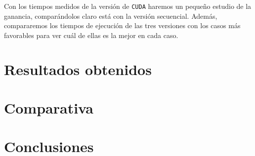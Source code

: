 \documentclass[11pt,a4paper]{article}
\begin{document}
Con los tiempos medidos de la versión de \texttt{CUDA} haremos un pequeño estudio de la ganancia,
comparándolos claro está con la versión secuencial. Además, compararemos los tiempos de ejecución
de las tres versiones con los casos más favorables para ver cuál de ellas es la mejor en cada
caso.

\section{Resultados obtenidos}

\section{Comparativa}

\section{Conclusiones}
\end{document}
